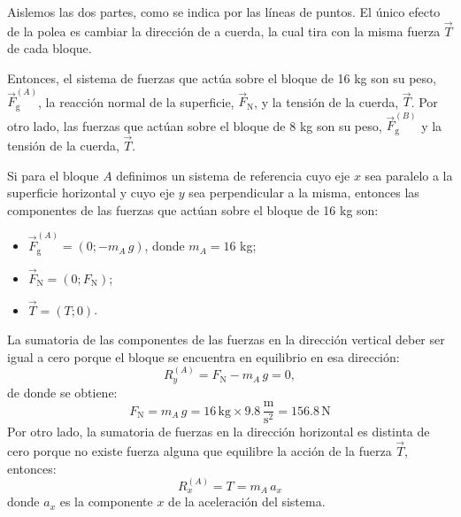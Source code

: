 \documentclass[addpoints]{exam}
\begin{document}
\begin{questions}
    \begin{solution}
        Aislemos las dos partes, como se indica por las líneas de puntos. El único efecto de la polea es cambiar la dirección de a cuerda, la cual tira con la misma fuerza $\vec{T}$ de cada bloque.

        Entonces, el sistema de fuerzas que actúa sobre el bloque de 16 kg son su peso, $\vec{F}_\text{g}^{(A)}$, la reacción normal de la superficie, $\vec{F}_\text{N}$, y la tensión de la cuerda, $\vec{T}$. Por otro lado, las fuerzas que actúan sobre el bloque de 8 kg son su peso, $\vec{F}_\text{g}^{(B)}$ y la tensión de la cuerda, $\vec{T}$.

        Si para el bloque $A$ definimos un sistema de referencia cuyo eje $x$ sea paralelo a la superficie horizontal y cuyo eje $y$ sea perpendicular a la misma, entonces las componentes de las fuerzas que actúan sobre el bloque de 16 kg son:
        \begin{itemize}
            \item $\vec{F}_\text{g}^{(A)} = \left(0; - m_A \, g\right)$, donde $m_A = 16$ kg;
            \item $\vec{F}_\text{N} = \left(0; F_\text{N}\right)$;
            \item $\vec{T} = \left(T;0\right)$.
        \end{itemize}
        La sumatoria de las componentes de las fuerzas en la dirección vertical deber ser igual a cero porque el bloque se encuentra en equilibrio en esa dirección: $$R_y^{(A)} = F_\text{N} - m_A \, g = 0,$$ de donde se obtiene: $$F_\text{N} = m_A \, g = 16 \, \text{kg} \times 9.8 \, \frac{\text{m}}{\text{s}^2} = 156.8 \, \text{N}$$ Por otro lado, la sumatoria de fuerzas en la dirección horizontal es distinta de cero porque no existe fuerza alguna que equilibre la acción de la fuerza $\vec{T}$, entonces: 
        \begin{equation}
            \label{ec:RxA_vinculados2}
            R_x^{(A)} = T = m_A \, a_x
        \end{equation} donde $a_x$ es la componente $x$ de la aceleración del sistema.


\end{solution}
\end{questions}
\end{document}

